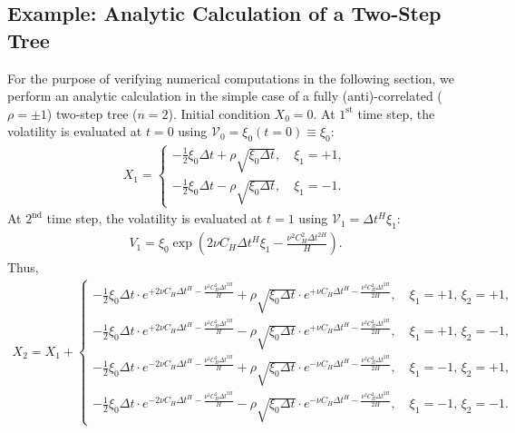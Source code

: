\documentclass[12pt]{article}
\numberwithin{equation}{section}
\begin{document}
\subsection{Example: Analytic Calculation of a Two-Step Tree}
For the purpose of verifying numerical computations in the following section, we perform an analytic calculation in the simple case of a fully (anti)-correlated ($\rho=\pm 1$) two-step tree ($n=2$). Initial condition $X_0=0$. At $1^{\text{st}}$ time step, the volatility is evaluated at $t=0$ using $\mathcal{V}_0 = \xi_0(t=0)\equiv \xi_0$:
\begin{align}
X_1 = \begin{cases}
-\frac{1}{2}\xi_0 \Delta t + \rho \sqrt{\xi_0\Delta t}, \quad \xi_1 = +1,\\
-\frac{1}{2}\xi_0 \Delta t - \rho \sqrt{\xi_0\Delta t}, \quad \xi_1 = -1.
\end{cases}
\end{align}
At $2^{\text{nd}}$ time step, the volatility is evaluated at $t=1$ using $\mathcal{V}_1 =\Delta t^H \xi_1$:
\begin{align}
V_1 = \xi_0 \exp\left( 2\nu C_H \Delta t^H \xi_1 - \frac{\nu^2 C_H^2 \Delta t^{2H}}{H} \right).
\end{align}
Thus,
{
\footnotesize{
\begin{align*}
X_2 = X_1 + \begin{cases}
-\frac{1}{2}\xi_0 \Delta t \cdot e^{+2 \nu C_H \Delta t^H - \frac{\nu^2 C_H^2 \Delta t^{2H}}{H}}
+\rho\sqrt{\xi_0\Delta t} \cdot e^{+\nu C_H \Delta t^H - \frac{\nu^2 C_H^2 \Delta t^{2H}}{2H}}, \quad \xi_1 = +1, \,\xi_2 = +1,\\
-\frac{1}{2}\xi_0 \Delta t \cdot e^{+2 \nu C_H \Delta t^H - \frac{\nu^2 C_H^2 \Delta t^{2H}}{H}}
-\rho\sqrt{\xi_0\Delta t} \cdot e^{+\nu C_H \Delta t^H - \frac{\nu^2 C_H^2 \Delta t^{2H}}{2H}}, \quad \xi_1 = +1, \,\xi_2 = -1,\\
-\frac{1}{2}\xi_0 \Delta t \cdot e^{-2 \nu C_H \Delta t^H - \frac{\nu^2 C_H^2 \Delta t^{2H}}{H}}
+\rho\sqrt{\xi_0\Delta t} \cdot e^{- \nu C_H \Delta t^H - \frac{\nu^2 C_H^2 \Delta t^{2H}}{2H}}, \quad \xi_1 = -1, \,\xi_2 = +1,\\
-\frac{1}{2}\xi_0 \Delta t \cdot e^{-2 \nu C_H \Delta t^H - \frac{\nu^2 C_H^2 \Delta t^{2H}}{H}}
-\rho\sqrt{\xi_0\Delta t} \cdot e^{- \nu C_H \Delta t^H - \frac{\nu^2 C_H^2 \Delta t^{2H}}{2H}}, \quad \xi_1 = -1, \,\xi_2 = -1.
\end{cases}
\end{align*}
}
}\\
\end{document}
